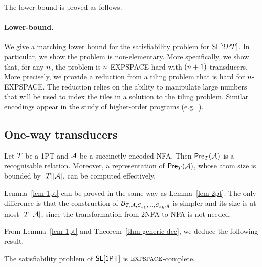 The lower bound is proved as follows. 


\paragraph{Lower-bound.}

We give a matching lower bound for the satisfiability problem for $\mathsf{SL}[2PT]$. 
In particular, we show the problem is non-elementary.
More specifically, we show that, for any $n$, the problem is $n$-EXPSPACE-hard with $(n+1)$ transducers. More precisely,
we provide a  reduction from a tiling problem that is hard for $n$-EXPSPACE.
The reduction relies on the ability to manipulate large numbers that will be used to index the tiles in a solution to the tiling problem.
Similar encodings appear in the study of higher-order programs (e.g.~\cite{J01,CW07}).


%


\subsection{One-way transducers}


\begin{lemma}\label{lem-1pt}
Let $T$ be a 1PT and $\mathcal{A}$ be a succinctly encoded NFA. Then $\textsf{Pre}_{T}(\mathcal{A})$ is a recognisable relation. Moreover, a representation of $\textsf{Pre}_{T}(\mathcal{A})$, whose atom size is bounded by $|T||\mathcal{A}|$, can be computed effectively.
\end{lemma}

Lemma~\ref{lem-1pt} can be proved in the same way as Lemma~\ref{lem-2pt}. The only difference is that the construction of $\mathcal{B}_{T, \mathcal{A}, S_{x_1}, \ldots, S_{x_k}, q}$ is simpler and its size is at most $|T| |\mathcal{A}|$, since the transformation from  2NFA to NFA is not needed.

From Lemma~\ref{lem-1pt} and Theorem~\ref{thm-generic-dec}, we deduce the following result.
%
\begin{theorem}
The satisfiability problem of $\textsf{SL}[\textsf{1PT}]$ is $\textsc{expspace}$-complete. 
\end{theorem}

